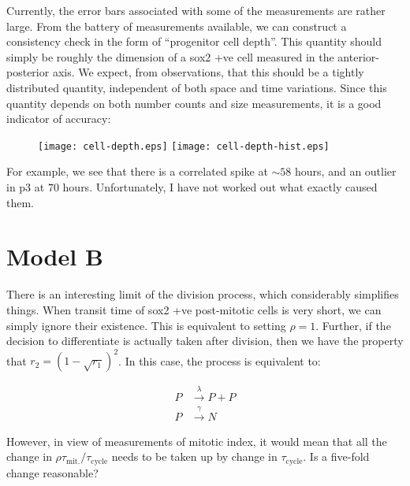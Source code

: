 \documentclass[10pt,english]{article}
\begin{document}
Currently, the error bars associated with some of the measurements are rather
large. From the battery of measurements available, we can construct a consistency
check in the form of ``progenitor cell depth''. This quantity should simply be
roughly the dimension of a sox2 +ve cell measured in the anterior-posterior axis.
We expect, from observations, that this should be a tightly distributed quantity,
independent of both space and time variations. Since this quantity depends
on both number counts and size measurements, it is a good indicator of accuracy:

\begin{figure}[h]
	\begin{center}
		\texttt{[image: cell-depth.eps]}
		\hfill
		\texttt{[image: cell-depth-hist.eps]}
	\end{center}
\end{figure}

For example, we see that there is a correlated spike at $\sim 58$ hours, and an
outlier in p3 at $70$ hours. Unfortunately, I have not worked out what exactly
caused them.

\section{Model B}

There is an interesting limit of the division process, which considerably
simplifies things. When transit time of sox2 +ve post-mitotic cells is very
short, we can simply ignore their existence. This is equivalent to setting
$\rho = 1$. Further, if the decision to differentiate is actually taken after
division, then we have the property that $r_2 = \left(1 - \sqrt{r_1} \right)^2$. 
In this case, the process is equivalent to:

\begin{align*}
P &\overset{\lambda}{\longrightarrow} P+P \\
P &\overset{\gamma}{\longrightarrow} N
\end{align*}

However, in view of measurements of mitotic index, it would mean that all the
change in $\rho \tau_\textrm{mit.} / \tau_\textrm{cycle}$ needs to be taken up
by change in $\tau_\textrm{cycle}$. Is a five-fold change reasonable?
\end{document}
